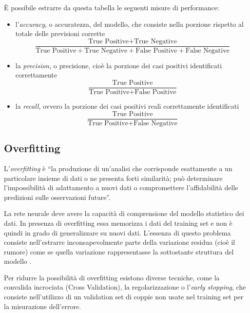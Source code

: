 È possibile estrarre da questa tabella le seguenti misure di performance:
\begin{itemize}
	\item l'\emph{accuracy}, o accuratezza, del modello, che consiste nella porzione rispetto al totale delle previsioni corrette
	\begin{equation}
		\frac{\mbox{True Positive} + \mbox{True Negative}}{\mbox{True Positive} + \mbox{True Negative} + \mbox{False Positive} + \mbox{False Negative}}
	\end{equation} 
	\item la \emph{precision}, o precisione, cioè la porzione dei casi positivi identificati correttamente
		\begin{equation}
	\frac{\mbox{True Positive}}{\mbox{True Positive} + \mbox{False Positive}}
	\end{equation}
	
	\item la \emph{recall}, ovvero la porzione dei casi positivi reali correttamente identificati
		\begin{equation}
	\frac{\mbox{True Positive}}{\mbox{True Positive} + \mbox{False Negative}}
	\end{equation}
\end{itemize}


\subsection{Overfitting}
\label{subsec:overfitting}

L'\emph{overfitting} è ``la produzione di un'analisi che corrisponde esattamente a un particolare insieme di dati o ne presenta forti similarità; può determinare l'impossibilità di adattamento a nuovi dati o compromettere l'affidabilità delle predizioni sulle osservazioni future''.

La rete neurale deve avere la capacità di comprensione del modello statistico dei dati. In presenza di overfitting essa memorizza i dati del training set e non è quindi in grado di generalizzare su nuovi dati. L'essenza di questo problema consiste nell'estrarre inconsapevolmente parte della variazione residua (cioè il rumore) come se quella variazione rappresentasse la sottostante struttura del modello \cite{burnham2003model}.

Per ridurre la possibilità di overfitting esistono diverse tecniche, come la convalida incrociata (Cross Validation), la regolarizzazione o l'\emph{early stopping}, che consiste nell'utilizzo di un validation set di coppie non usate nel training set per la misurazione dell'errore.
